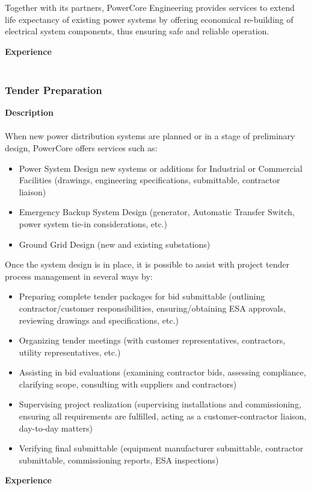 Together with its partners, PowerCore Engineering provides services to extend life expectancy of existing power systems by offering economical re-building of electrical system components, thus ensuring safe and reliable operation.

\textbf{Experience}\\
\\	

\subsubsection{Tender Preparation}
\label{Sub:Exp:TP}

\textbf{Description}\\
\\
When new power distribution systems are planned or in a stage of preliminary design, PowerCore offers services such as:
\begin{itemize}
	\item Power System Design new systems or additions for Industrial or Commercial Facilities (drawings, engineering specifications, submittable, contractor liaison)
	\item Emergency Backup System Design (generator, Automatic Transfer Switch, power system tie-in considerations, etc.)
	\item Ground Grid Design (new and existing substations)
\end{itemize}
Once the system design is in place, it is possible to assist with project tender process management in several ways by:
\begin{itemize}
	\item Preparing complete tender packages for bid submittable (outlining contractor/customer responsibilities, ensuring/obtaining ESA approvals, reviewing drawings and specifications, etc.)
	\item Organizing tender meetings (with customer representatives, contractors, utility representatives, etc.)
	\item Assisting in bid evaluations (examining contractor bids, assessing compliance, clarifying scope, consulting with suppliers and contractors)
	\item Supervising project realization (supervising installations and commissioning, ensuring all requirements are fulfilled, acting as a customer-contractor liaison, day-to-day matters)
	\item Verifying final submittable (equipment manufacturer submittable, contractor submittable, commissioning reports, ESA inspections)

\end{itemize}
\textbf{Experience}\\
\\	

